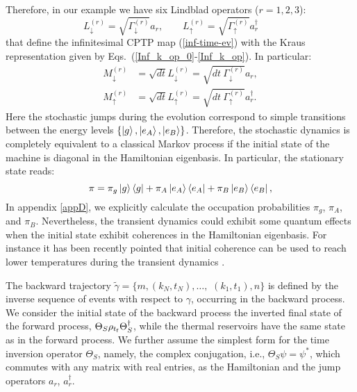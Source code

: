 \documentclass[aps,prx,twocolumn,showpacs,floatfix,superscriptaddress,graphics,longbibliography]{revtex4-1}
\begin{document}
Therefore, in our example we have six Lindblad operators ($r=1,2,3$): 
\begin{equation}
L_{\downarrow}^{(r)} = \sqrt{\Gamma_\downarrow^{(r)}}a_r,  \qquad 
L_{\uparrow}^{(r)} = \sqrt{\Gamma_\uparrow^{(r)}}a^\dagger_r \qquad 
\end{equation}
that define the infinitesimal CPTP map (\ref{inf-time-ev}) with the Kraus representation given by  Eqs.~(\ref{Inf_k_op_0}-\ref{Inf_k_op}). In particular:
\begin{align} \label{L_operators2}
M_{\downarrow}^{(r)} & = \sqrt{dt} L_{\downarrow}^{(r)} = \sqrt{dt ~\Gamma_\downarrow^{(r)}} a_r,  \\ 
M_{\uparrow}^{(r)} & = \sqrt{dt} L_{\uparrow}^{(r)} = \sqrt{dt ~\Gamma_\uparrow^{(r)}} a_r^\dagger. 
\end{align}
Here the stochastic jumps during the evolution correspond to simple transitions between 
the energy levels $\{ \ket{g}, \ket{e_A}, \ket{e_B}\}$.
Therefore, the stochastic dynamics is completely equivalent to a classical Markov process if the initial state of the machine is diagonal in the Hamiltonian eigenbasis. In particular, the stationary state reads:
\begin{equation}\label{ss}
\pi = \pi_g \ket{g}\bra{g} + \pi_{A} \ket{e_A}\bra{e_A} + \pi_{B} \ket{e_B}\bra{e_B}, 
\end{equation}
In appendix \ref{appD}, we explicitly calculate the occupation probabilities $\pi_g$, $\pi_{A}$, and $\pi_{B}$.
Nevertheless, the transient dynamics could exhibit some quantum effects when the initial state exhibit coherences in the Hamiltonian eigenbasis. For instance it has been recently pointed that initial coherence can be used to reach lower temperatures during the transient dynamics \cite{Mitchison, Brask}.


The backward trajectory $\tilde{\gamma} = \{ m, (k_N, t_N),\dots,$ $(k_1, t_1), n\}$ is defined by the inverse sequence of events with respect to $\gamma$, occurring in 
the backward process. We consider the initial state of the backward process the inverted final state of the forward process, $\Theta_S \rho_{t_{\rm f}} \Theta_S^\dagger$, 
while the thermal reservoirs have the same state as in the forward process. We further assume the simplest form for the time inversion operator $\Theta_S$, namely, the complex conjugation, i.e., $\Theta_S\psi=\psi^*$, which commutes with any matrix with real entries, as the Hamiltonian and the jump operators $a_r$, $a^\dagger_r$. 
\end{document}
